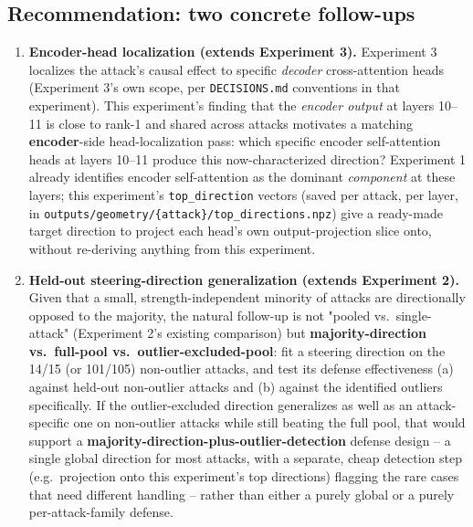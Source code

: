 \documentclass[11pt]{article}
\begin{document}
\subsection*{Recommendation: two concrete follow-ups}

\begin{enumerate}
  \item \textbf{Encoder-head localization (extends Experiment 3).}
  Experiment 3 localizes the attack's causal effect to specific
  \emph{decoder} cross-attention heads (Experiment 3's own scope, per
  \texttt{DECISIONS.md} conventions in that experiment). This experiment's
  finding that the \emph{encoder output} at layers 10--11 is close to
  rank-1 and shared across attacks motivates a matching
  \textbf{encoder}-side head-localization pass: which specific encoder
  self-attention heads at layers 10--11 produce this now-characterized
  direction? Experiment 1 already identifies encoder self-attention as the
  dominant \emph{component} at these layers; this experiment's
  \texttt{top\_direction} vectors (saved per attack, per layer, in
  \texttt{outputs/geometry/\{attack\}/top\_directions.npz}) give a
  ready-made target direction to project each head's own output-projection
  slice onto, without re-deriving anything from this experiment.
  \item \textbf{Held-out steering-direction generalization (extends
  Experiment 2).} Given that a small, strength-independent minority of
  attacks are directionally opposed to the majority, the natural
  follow-up is not "pooled vs.\ single-attack" (Experiment 2's existing
  comparison) but \textbf{majority-direction vs.\ full-pool vs.\
  outlier-excluded-pool}: fit a steering direction on the 14/15 (or
  101/105) non-outlier attacks, and test its defense effectiveness (a)
  against held-out non-outlier attacks and (b) against the identified
  outliers specifically. If the outlier-excluded direction generalizes as
  well as an attack-specific one on non-outlier attacks while still
  beating the full pool, that would support a
  \textbf{majority-direction-plus-outlier-detection} defense design -- a
  single global direction for most attacks, with a separate, cheap
  detection step (e.g.\ projection onto this experiment's top directions)
  flagging the rare cases that need different handling -- rather than
  either a purely global or a purely per-attack-family defense.
\end{enumerate}

\end{document}
